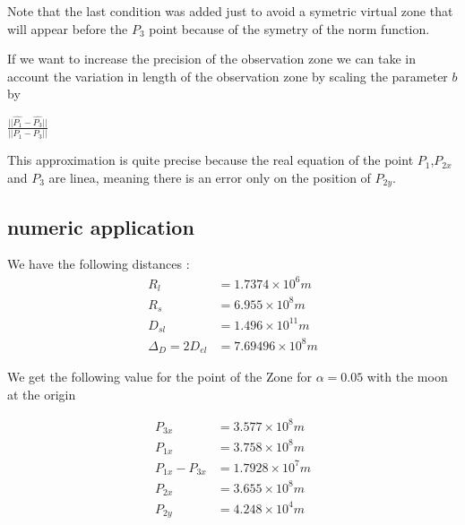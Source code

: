 \documentclass[11pt]{article} %
\begin{document}
		Note that the last condition was added just to avoid a symetric virtual zone that will appear before the $P_3$ point because of the symetry of the norm function.
		
		
		
		If we want to increase the precision of the observation zone we can take in account the variation in length of the observation zone by scaling the parameter $b$ by
		
		
		$\frac{||\hat{P_1}-\hat{P_3}||}{||P_1-P_3||}$
		
		This approximation is quite precise because the real equation of the point $P_1$,$P_{2x}$ and $P_3$ are linea, meaning there is an error only on the position of $P_{2y}$.
		
		\subsection{numeric application}
		We have the following distances : 
		$$
		\begin{align}
			R_l&=1.7374\times10^6 m \\
			R_s&=6.955\times10^8 m \\ 
			D_{sl}&=1.496\times10^{11} m \\
			\Delta_D=2D_{el}&= 7.69496\times10^8 m
		\end{align}
		$$
		
		We get the following value for the point of the Zone for $\alpha=0.05$ with the moon at the origin
		
		$$
		\begin{align}
			P_{3x}&=3.577\times10^8 m \\
			P_{1x}&=3.758\times10^8 m \\ 
			P_{1x}-P_{3x}&=1.7928\times10^7 m \\ 
			P_{2x}&=3.655\times10^8 m \\
			P_{2y}&= 4.248\times10^4 m
		\end{align}
		$$
		
\end{document}
